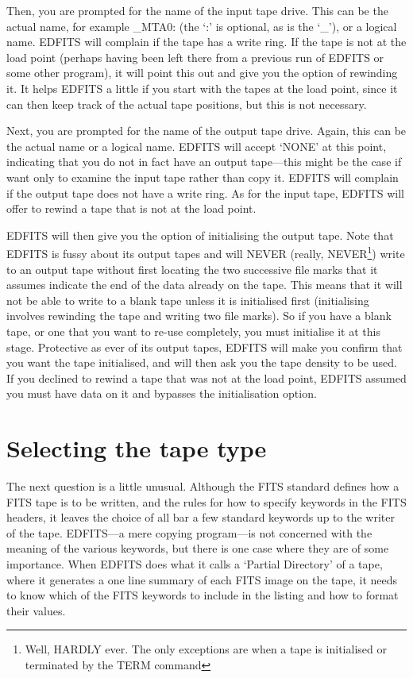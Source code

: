Then, you are prompted for the name of the input tape drive.  This can be
the actual name, for example \_MTA0: (the `:' is optional, as is the `\_'),
or a logical name.  EDFITS will complain if the tape has a write ring.  If
the tape is not at the load point (perhaps having been left there from a
previous run of EDFITS or some other program), it will point this out and
give you the option of rewinding it.  It helps EDFITS a little if you start
with the tapes at the load point, since it can then keep track of the actual
tape positions, but this is not necessary.

Next, you are prompted for the name of the output tape drive.  Again, this
can be the actual name or a logical name.  EDFITS will accept `NONE' at this
point, indicating that you do not in fact have an output tape---this might be
the case if want only to examine the input tape rather than copy it.  EDFITS
will complain if the output tape does not have a write ring.  As for the
input tape, EDFITS will offer to rewind a tape that is not at the load point.

EDFITS will then give you the option of initialising the output tape.  Note
that EDFITS is fussy about its output tapes and will NEVER (really,
NEVER\footnote{Well, HARDLY ever.  The only exceptions are when a tape is
initialised or terminated by the TERM command})
write to an output tape without first locating the two successive file marks
that it assumes indicate the end of the data already on the tape.  This means
that it will not be able to write to a blank tape unless it is initialised
first (initialising involves rewinding the tape and writing two file marks).
So if you have a blank tape, or one that you want to re-use completely, you
must initialise it at this stage.  Protective as ever of its output tapes,
EDFITS will make you confirm that you want the tape initialised, and will
then ask you the tape density to be used.  If you declined to rewind a tape
that was not at the load point, EDFITS assumed you must have data on it and
bypasses the initialisation option.

\section{Selecting the tape type}

The next question is a little unusual.  Although the FITS standard defines
how a FITS tape is to be written, and the rules for how to specify keywords
in the FITS headers, it leaves the choice of all bar a few standard keywords
up to the writer of the tape.  EDFITS---a mere copying program---is not
concerned with the meaning of the various keywords, but there is one case
where they are of some importance.  When EDFITS does what it calls a
`Partial Directory' of a tape, where it generates a one line summary of
each FITS image on the tape, it needs to know which of the FITS keywords to
include in the listing and how to format their values.

